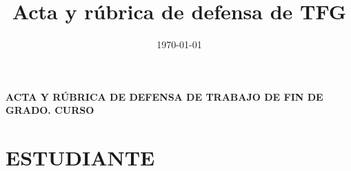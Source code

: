%
%
%


\graphicspath{{../../Book/logos/}{../../Book/figures/}{../../Book/diagrams/}} %

\title{Acta y rúbrica de defensa de TFG}  %
\date{\today}                                  %
\author{\myAcademicTutorFullName}                           %



%
%



\noindent \textbf{ACTA Y RÚBRICA DE DEFENSA DE TRABAJO DE FIN DE GRADO. CURSO \myThesisAcademicYear}



\section*{ESTUDIANTE}

